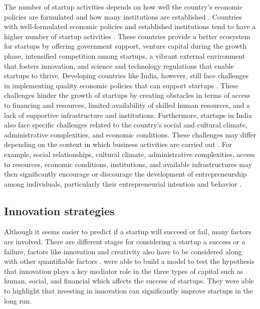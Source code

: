 \documentclass[12pt]{article}
\begin{document}
The number of startup activities depends on how well the country's economic policies are formulated and how many institutions are established \citep{sundaram2022factors}. Countries with well-formulated economic policies and established institutions tend to have a higher number of startup activities \citep{sundaram2022factors}. These countries provide a better ecosystem for startups by offering government support, venture capital during the growth phase, intensified competition among startups, a vibrant external environment that fosters innovation, and science and technology regulations that enable startups to thrive\citep{sundaram2022factors}. Developing countries like India, however, still face challenges in implementing quality economic policies that can support startups \citep{sundaram2022factors}. These challenges hinder the growth of startups by creating obstacles in terms of access to financing and resources, limited availability of skilled human resources, and a lack of supportive infrastructure and institutions. Furthermore, startups in India also face specific challenges related to the country's social and cultural climate, administrative complexities, and economic conditions. These challenges may differ depending on the context in which business activities are carried out \citep{al2023factors}. For example, social relationships, cultural climate, administrative complexities, access to resources, economic conditions, institutions, and available infrastructures may then significantly encourage or discourage the development of entrepreneurship among individuals, particularly their entrepreneurial intention and behavior \citep{al2023factors}.

\subsection{Innovation strategies}
Although it seems easier to predict if a startup will succeed or fail, many factors are involved. There are different stages for considering a startup a success or a failure, factors like innovation and creativity also have to be considered along with other quantifiable factors \citep{dellermann2021finding}.
 \citep{omri2015empirical} were able to build a model to test the hypothesis that innovation plays a key mediator role in the three types of capital such as human, social, and financial which affects the success of startups. They were able to highlight that investing in innovation can significantly improve startups in the long run.
\end{document}
